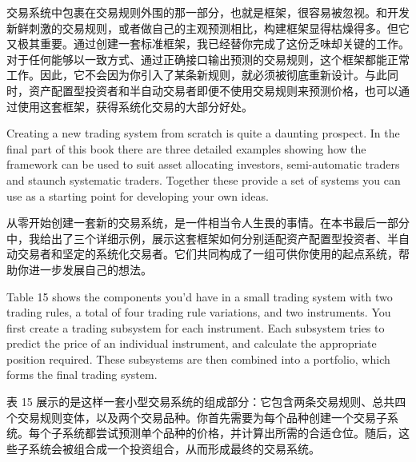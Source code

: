 \begin{chineseblock}交易系统中包裹在交易规则外围的那一部分，也就是框架，很容易被忽视。和开发新鲜刺激的交易规则，或者做自己的主观预测相比，构建框架显得枯燥得多。但它又极其重要。通过创建一套标准框架，我已经替你完成了这份乏味却关键的工作。对于任何能够以一致方式、通过正确接口输出预测的交易规则，这个框架都能正常工作。因此，它不会因为你引入了某条新规则，就必须被彻底重新设计。与此同时，资产配置型投资者和半自动交易者即便不使用交易规则来预测价格，也可以通过使用这套框架，获得系统化交易的大部分好处。\end{chineseblock}


\begin{englishblock} Creating a new trading system from scratch is quite a daunting prospect. In the final part of this book there are three detailed examples showing how the framework can be used to suit asset allocating investors, semi-automatic traders and staunch systematic traders. Together these provide a set of systems you can use as a starting point for developing your own ideas. \end{englishblock}

\begin{chineseblock}从零开始创建一套新的交易系统，是一件相当令人生畏的事情。在本书最后一部分中，我给出了三个详细示例，展示这套框架如何分别适配资产配置型投资者、半自动交易者和坚定的系统化交易者。它们共同构成了一组可供你使用的起点系统，帮助你进一步发展自己的想法。\end{chineseblock}


\begin{englishblock} Table 15 shows the components you'd have in a small trading system with two trading rules, a total of four trading rule variations, and two instruments. You first create a trading subsystem for each instrument. Each subsystem tries to predict the price of an individual instrument, and calculate the appropriate position required. These subsystems are then combined into a portfolio, which forms the final trading system. \end{englishblock}

\begin{chineseblock}表 15 展示的是这样一套小型交易系统的组成部分：它包含两条交易规则、总共四个交易规则变体，以及两个交易品种。你首先需要为每个品种创建一个交易子系统。每个子系统都尝试预测单个品种的价格，并计算出所需的合适仓位。随后，这些子系统会被组合成一个投资组合，从而形成最终的交易系统。\end{chineseblock}

